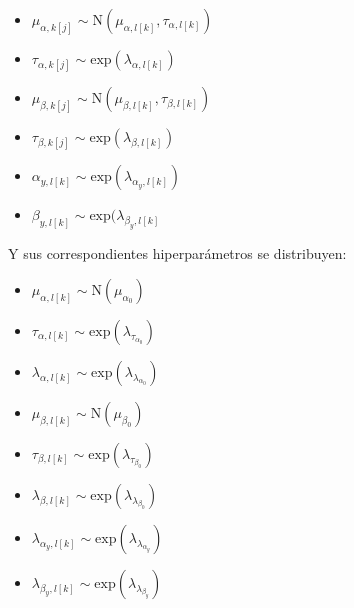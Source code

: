 \begin{itemize}

	\item $\mu_{\alpha, k[j]} \sim \mathrm{N} (\mu_{\alpha, l[k]}, \tau_{\alpha, l[k]})$

	\item $\tau_{\alpha, k[j]} \sim \mathrm{exp} (\lambda_{\alpha, l[k]})$

	\item $\mu_{\beta, k[j]} \sim \mathrm{N} (\mu_{\beta, l[k]}, \tau_{\beta, l[k]})$

	\item $\tau_{\beta, k[j]} \sim \mathrm{exp} (\lambda_{\beta, l[k]})$

	\item $\alpha_{y, l[k]} \sim \mathrm{exp} (\lambda_{\alpha_y, l[k]})$

	\item $\beta_{y, l[k]} \sim \mathrm{exp} (\lambda_{\beta_y, l[k]}$

\end{itemize}

Y sus correspondientes hiperparámetros se distribuyen:

\begin{itemize}

	\item $\mu_{\alpha, l[k]} \sim \mathrm{N}(\mu_{\alpha_0})$
	
	\item $\tau_{\alpha, l[k]} \sim \mathrm{exp}(\lambda_{\tau_{\alpha_0}})$
	
	\item $\lambda_{\alpha, l[k]} \sim \mathrm{exp}(\lambda_{\lambda_{\alpha_0}})$
	
	\item $\mu_{\beta, l[k]} \sim \mathrm{N}(\mu_{\beta_0})$
	
	\item $\tau_{\beta, l[k]} \sim \mathrm{exp}(\lambda_{\tau_{\beta_0}})$
	
	\item $\lambda_{\beta, l[k]} \sim \mathrm{exp}(\lambda_{\lambda_{\beta_0}})$
	
	\item $\lambda_{\alpha_y, l[k]} \sim \mathrm{exp}(\lambda_{\lambda_{\alpha_y}})$
	
	\item $\lambda_{\beta_y, l[k]} \sim \mathrm{exp}(\lambda_{\lambda_{\beta_y}})$
	

\end{itemize}

